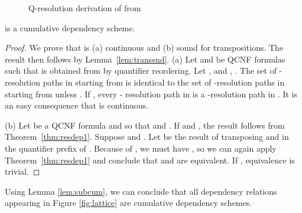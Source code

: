 \documentclass{llncs}
\newcommand{\longversion}[1]{#1}
\newcommand{\shortversion}[1]{}
\def\hy{\hbox{-}\nobreak\hskip0pt} \newcommand{\ellipsis}{}
\begin{document}
\shortversion{\begin{figure}[b]}
\longversion{\begin{figure}}
\begin{center}
\end{center}
\caption{Q\hy resolution derivation of  from } 
\label{fig:resolutionderivation}
\end{figure}
\begin{theorem}\label{thm:DresDep}
   is a cumulative dependency scheme.
\end{theorem}
\begin{proof} We prove that  is (a) continuous and (b) sound for
  transpositions. The result then follows by Lemma~\ref{lem:transsnd}. (a) Let
   and  be QCNF formulas such that  is obtained from
   by quantifier reordering. Let , and
  , . The set of
  \hy resolution paths in  starting from  is identical to the set
  of \hy resolution paths in  starting from  unless . If , every \hy
  resolution path in  is a \hy resolution path in . It is an
  easy consequence that  is continuous.

  (b) Let  be a QCNF formula and  so that
   and . If  and , the result follows from
  Theorem~\ref{thm:resdep1}. Suppose  and . Let  be the result of transposing 
  and  in the quantifier prefix of . Because of , we must have , so we can again
  apply Theorem~\ref{thm:resdep1} and conclude that  and  are
  equivalent. If , equivalence is trivial.
\end{proof}
Using Lemma \ref{lem:subcum}, we can conclude that all dependency relations
appearing in Figure \ref{fig:lattice} are cumulative dependency schemes.
\end{document}
